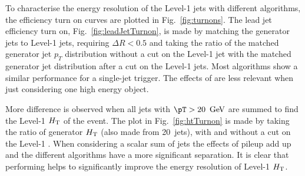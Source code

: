 To characterise the energy resolution of the Level-1 jets with
different \PUS algorithms, the efficiency turn on curves are plotted
in Fig.~\ref{fig:turnons}. The lead jet efficiency turn on,
Fig.~\ref{fig:leadJetTurnon}, is
made by matching the generator jets to Level-1 jets, requiring $\Delta
R<0.5$ and taking the ratio of the matched generator jet $p_T$
distribution without a cut on the Level-1 jet with the matched
generator jet distribution after a cut on the Level-1 jets. Most algorithms
show a similar performance for a single-jet trigger. The effects of
\PU are less relevant when just considering one high energy object.

More difference is observed when all jets with $\pT>20~\gev$ are
summed to find the Level-1 $\mbox{$H_\text{T}$}$ of the event. The plot in
Fig.~\ref{fig:htTurnon} is made by taking the ratio of generator $\mbox{$H_\text{T}$}$
(also made from 20~\gev jets), with and without a cut on the Level-1
\HT. When considering a scalar sum of jets the effects of pileup
add up and the different algorithms have a more significant
separation. It is clear that performing \PUS helps to significantly
improve the energy resolution of Level-1 $\mbox{$H_\text{T}$}$.
